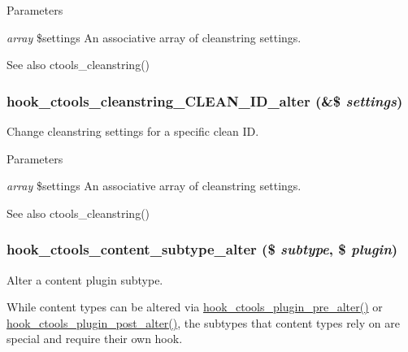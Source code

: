 \begin{DoxyParams}{Parameters}
\item[{\em array}]\$settings An associative array of cleanstring settings.\end{DoxyParams}
\begin{DoxySeeAlso}{See also}
ctools\_\-cleanstring() 
\end{DoxySeeAlso}
\hypertarget{group__hooks_gaa77de664d1ef915311e4f768eb6c62ea}{
\subsubsection[{hook\_\-ctools\_\-cleanstring\_\-CLEAN\_\-ID\_\-alter}]{\setlength{\rightskip}{0pt plus 5cm}hook\_\-ctools\_\-cleanstring\_\-CLEAN\_\-ID\_\-alter (\&\$ {\em settings})}}
\label{group__hooks_gaa77de664d1ef915311e4f768eb6c62ea}
Change cleanstring settings for a specific clean ID.


\begin{DoxyParams}{Parameters}
\item[{\em array}]\$settings An associative array of cleanstring settings.\end{DoxyParams}
\begin{DoxySeeAlso}{See also}
ctools\_\-cleanstring() 
\end{DoxySeeAlso}
\hypertarget{group__hooks_ga095e4e5a15a03861b5e708e3454bf154}{
\subsubsection[{hook\_\-ctools\_\-content\_\-subtype\_\-alter}]{\setlength{\rightskip}{0pt plus 5cm}hook\_\-ctools\_\-content\_\-subtype\_\-alter (\$ {\em subtype}, \/  \$ {\em plugin})}}
\label{group__hooks_ga095e4e5a15a03861b5e708e3454bf154}
Alter a content plugin subtype.

While content types can be altered via \hyperlink{group__hooks_ga4ae530d112605c111f7bdead789ed91d}{hook\_\-ctools\_\-plugin\_\-pre\_\-alter()} or \hyperlink{group__hooks_ga2f8a7bad70a9bcb0748a13463a32d362}{hook\_\-ctools\_\-plugin\_\-post\_\-alter()}, the subtypes that content types rely on are special and require their own hook.

